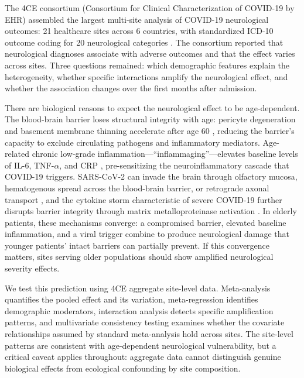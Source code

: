 \documentclass{article}
\begin{document}
The 4CE consortium (Consortium for Clinical Characterization of COVID-19 by EHR) assembled the largest multi-site analysis of COVID-19 neurological outcomes: 21 healthcare sites across 6 countries, with standardized ICD-10 outcome coding for 20 neurological categories \cite{four_ce_neuro2021}.
The consortium reported that neurological diagnoses associate with adverse outcomes and that the effect varies across sites.
Three questions remained: which demographic features explain the heterogeneity, whether specific interactions amplify the neurological effect, and whether the association changes over the first months after admission.

There are biological reasons to expect the neurological effect to be age-dependent.
The blood-brain barrier loses structural integrity with age: pericyte degeneration and basement membrane thinning accelerate after age 60 \cite{montagne2015bbb}, reducing the barrier's capacity to exclude circulating pathogens and inflammatory mediators.
Age-related chronic low-grade inflammation---``inflammaging''---elevates baseline levels of IL-6, TNF-$\alpha$, and CRP \cite{franceschi2018inflammaging}, pre-sensitizing the neuroinflammatory cascade that COVID-19 triggers.
SARS-CoV-2 can invade the brain through olfactory mucosa, hematogenous spread across the blood-brain barrier, or retrograde axonal transport \cite{song2021neuroinvasion}, and the cytokine storm characteristic of severe COVID-19 further disrupts barrier integrity through matrix metalloproteinase activation \cite{iadecola2020covid}.
In elderly patients, these mechanisms converge: a compromised barrier, elevated baseline inflammation, and a viral trigger combine to produce neurological damage that younger patients' intact barriers can partially prevent.
If this convergence matters, sites serving older populations should show amplified neurological severity effects.

We test this prediction using 4CE aggregate site-level data.
Meta-analysis quantifies the pooled effect and its variation, meta-regression identifies demographic moderators, interaction analysis detects specific amplification patterns, and multivariate consistency testing examines whether the covariate relationships assumed by standard meta-analysis hold across sites.
The site-level patterns are consistent with age-dependent neurological vulnerability, but a critical caveat applies throughout: aggregate data cannot distinguish genuine biological effects from ecological confounding by site composition.
\end{document}
